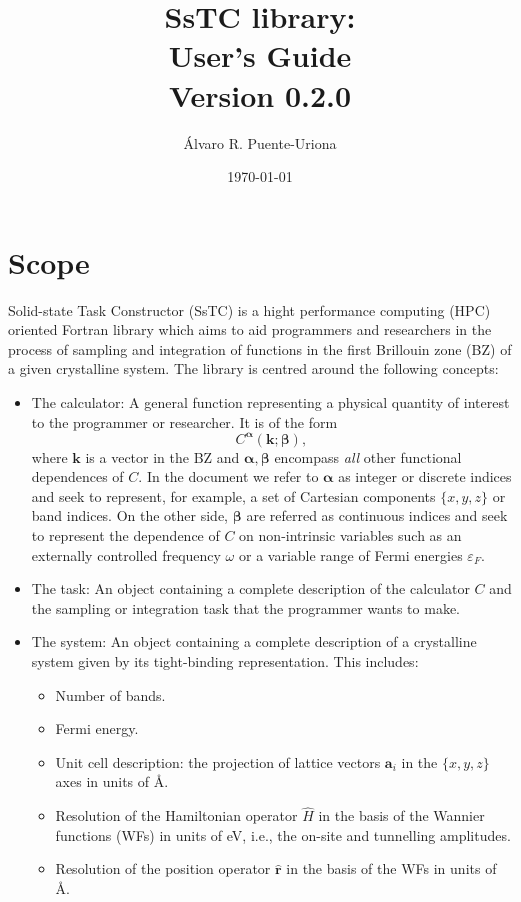 \documentclass[10pt,a4paper]{article}
\title{SsTC library:\\
\large{User's Guide}\\
\large{Version 0.2.0}}
\author{Álvaro R. Puente-Uriona}
\date{\today}
\begin{document}
\maketitle
\tableofcontents
\newpage
\section{Scope}
Solid-state Task Constructor (SsTC) is a hight performance computing (HPC) oriented Fortran library which aims to aid programmers and researchers in the process of sampling and integration of functions in the first Brillouin zone (BZ) of a given crystalline system. The library is centred around the following concepts:
\begin{tcolorbox}\begin{itemize}
\item The calculator: A general function representing a physical quantity of interest to the programmer or researcher. It is of the form
\begin{equation}\label{eq:calculator}
C^{\bm{\alpha}}(\bm{k}; \bm{\beta}),
\end{equation}
where $\bm{k}$ is a vector in the BZ and $\bm{\alpha}, \bm{\beta}$ encompass \textit{all} other functional dependences of $C$. In the document we refer to $\bm{\alpha}$ as integer or discrete indices and seek to represent, for example, a set of Cartesian components $\{x, y, z\}$ or band indices. On the other side, $\bm{\beta}$ are referred as continuous indices and seek to represent the dependence of $C$ on non-intrinsic variables such as an externally controlled frequency $\omega$ or a variable range of Fermi energies $\varepsilon_F$.
\item The task: An object containing a complete description of the calculator $C$ and the sampling or integration task that the programmer wants to make.
\item The system: An object containing a complete description of a crystalline system given by its tight-binding \cite{marzariMaximallyLocalizedWannier2012} representation. This includes:
\begin{tcolorbox}\begin{itemize}
\item Number of bands.
\item Fermi energy.
\item Unit cell description: the projection of lattice vectors $\bm{a}_i$ in the $\{x, y, z\}$ axes in units of \r{A}.
\item Resolution of the Hamiltonian operator $\hat{H}$ in the basis of the Wannier functions (WFs) \cite{marzariMaximallyLocalizedWannier2012} in units of eV, i.e., the on-site and tunnelling amplitudes.
\item Resolution of the position operator $\hat{\bm{r}}$ in the basis of the WFs in units of \r{A}.
\end{itemize}\end{tcolorbox}
\end{itemize}
\end{tcolorbox}
\end{document}
